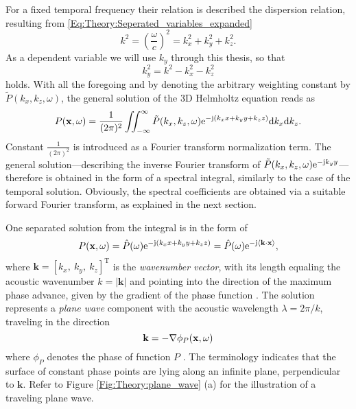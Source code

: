 For a fixed temporal frequency their relation is described the dispersion relation, resulting from \eqref{Eq:Theory:Seperated_variables_expanded}
\begin{equation}
k^2 = \left( \frac{\omega}{c} \right)^2 = k_x^2 + k_y^2 + k_z^2.
\end{equation}
As a dependent variable we will use $k_y$ through this thesis, so that
\begin{equation}
k_y^2 = k^2 - k_x^2 - k_z^2
\end{equation}
holds.
With all the foregoing and by denoting the arbitrary weighting constant by $\tilde{P}(k_x,k_z, \omega)$, the general solution of the 3D Helmholtz equation reads as
\begin{equation}
P(\mathbf{x},\omega) = \frac{1}{(2\pi)^2}\iint_{-\infty}^{\infty} \tilde{P}(k_x,k_z, \omega)  \mathrm{e}^{- \mathrm{j} \left( k_x x + k_y y + k_z z \right) }
\mathrm{d} k_x\mathrm{d} k_z.
\label{Eq:Theory:Helmholtz_Inverse_Fourier}
\end{equation}
Constant $\frac{1}{(2\pi)^2}$ is introduced as a Fourier transform normalization term. 
The general solution---describing the inverse Fourier transform of $\tilde{P}(k_x,k_z, \omega)  \mathrm{e}^{- \mathrm{j} k_y y }$---therefore is obtained in the form of a spectral integral, similarly to the case of the temporal solution.
Obviously, the spectral coefficients are obtained via a suitable forward Fourier transform, as explained in the next section.

One separated solution from the integral is in the form of \cite{Williams1999}
\begin{equation}
P(\mathbf{x},\omega) = \hat{P}(\omega) \mathrm{e}^{-\mathrm{j} \left( k_x x + k_y y + k_z z \right) } =  \hat{P}(\omega) \mathrm{e}^{-\mathrm{j} \left< \mathbf{k} \cdot \mathbf{x} \right> },
\end{equation}
where $\mathbf{k} = [k_x,\ k_y,\ k_z]^{\mathrm{T}}$ is the \emph{wavenumber vector}, with its length equaling the acoustic wavenumber $k = | \mathbf{k}|$ and pointing into the direction of the maximum phase advance, given by the gradient of the phase function  .
The solution represents a \emph{plane wave} component with the acoustic wavelength $\lambda = 2\pi/k$, traveling in the direction
\begin{equation}
\mathbf{k} = - \nabla \phi_P(\mathbf{x},\omega)
\label{Eq:Theory:PW_wavenumber_vec}
\end{equation}
where $\phi_P$ denotes the phase of function $P$  .
The terminology indicates that the surface of constant phase points are lying along an infinite plane, perpendicular to $\mathbf{k}$. Refer to Figure \ref{Fig:Theory:plane_wave} (a) for the illustration of a traveling plane wave.

